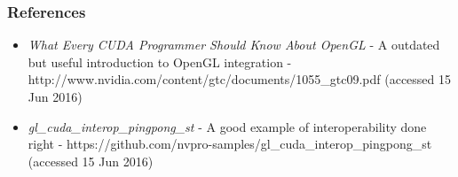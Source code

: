 \begin{frame}

\frametitle{References}

\begin{itemize}
	\item{\emph{What Every CUDA Programmer Should Know About OpenGL} -
		A outdated but useful introduction to OpenGL integration -
		http://www.nvidia.com/content/gtc/documents/1055_gtc09.pdf (accessed 15 Jun 2016)}
	\item{\emph{gl_cuda_interop_pingpong_st} -
		A good example of interoperability done right -
		https://github.com/nvpro-samples/gl_cuda_interop_pingpong_st (accessed 15 Jun 2016)}
\end{itemize}

\end{frame}
